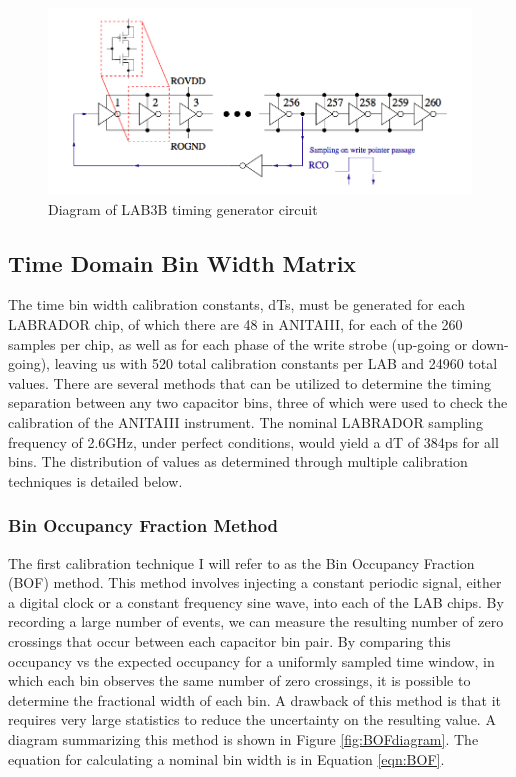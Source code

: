 \noindent		
\begin{figure}
	\includegraphics[width=\textwidth]{figures/LAB3BTimingGenerator}
	\caption{Diagram of LAB3B timing generator circuit\cite{LABASICPAPER} }
	\label{fig:timingGenerator}
\end{figure}

	\subsection{Time Domain Bin Width Matrix}
		The time bin width calibration constants, dTs, must be generated for each LABRADOR chip, of which there are 48 in ANITAIII, for each of the 260 samples per chip, as well as for each phase of the write strobe (up-going or down-going), leaving us with 520 total calibration constants per LAB and 24960 total values. There are several methods that can be utilized to determine the timing separation between any two capacitor bins, three of which were used to check the calibration of the ANITAIII instrument.  The nominal LABRADOR sampling frequency of 2.6GHz, under perfect conditions, would yield a dT of 384ps for all bins.  The distribution of values as determined through multiple calibration techniques is detailed below.
		
	\subsubsection{Bin Occupancy Fraction Method}
		
		The first calibration technique I will refer to as the Bin Occupancy Fraction (BOF) method.  This method involves injecting a constant periodic signal, either a digital clock or a constant frequency sine wave, into each of the LAB chips.  By recording a large number of events, we can measure the resulting number of zero crossings that occur between each capacitor bin pair.  By comparing this occupancy vs the expected occupancy for a uniformly sampled time window, in which each bin observes the same number of zero crossings, it is possible to determine the fractional width of each bin.  A drawback of this method is that it requires very large statistics to reduce the uncertainty on the resulting value.  A diagram summarizing this method is shown in Figure \ref{fig:BOFdiagram}.  The equation for calculating a nominal bin width is in Equation \ref{eqn:BOF}.
		
